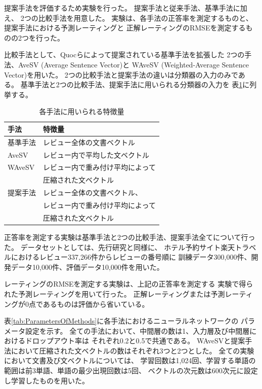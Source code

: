 \documentclass[twocolumn,a4paper]{ltjarticle}
\begin{document}
提案手法を評価するため実験を行った。
提案手法と従来手法\cite{fujitani15}、基準手法に加え、 2つの比較手法を用意した。
実験は、各手法の正答率を測定するものと、提案手法における予測レーティングと
正解レーティングのRMSEを測定するものの2つを行った。

比較手法として、Quocら\cite{quoc14}によって提案されている基準手法を拡張した
2つの手法、AveSV (Average Sentence Vector)と
WAveSV (Weighted-Average Sentence Vector)を用いた。
2つの比較手法と提案手法の違いは分類器の入力のみである。
基準手法と2つの比較手法、提案手法に用いられる分類器の入力を
表\ref{tab:MethodFeatures}に列挙する。

\begin{table}[b]
  \caption{各手法に用いられる特徴量}
  \centering
  \begin{tabularx}{\linewidth}{l | X} \label{tab:MethodFeatures}
    手法 & 特徴量 \\
    \hline
    基準手法 & レビュー全体の文書ベクトル \\
    \hline
    AveSV & レビュー内で平均した文ベクトル \\
    \hline
    WAveSV & レビュー内で重み付け平均によって \\
           & 圧縮された文ベクトル \\
    \hline
    提案手法 & レビュー全体の文書ベクトル、\\
             & レビュー内で重み付け平均によって \\
             & 圧縮された文ベクトル \\
  \end{tabularx}
\end{table}


正答率を測定する実験は基準手法と2つの比較手法、提案手法全てについて行った。
データセットとしては、先行研究\cite{fujitani15}と同様に、
ホテル予約サイト楽天トラベルにおけるレビュー337,266件からレビューの番号順に
訓練データ300,000件、開発データ10,000件、評価データ10,000件を用いた。

レーティングのRMSEを測定する実験は、上記の正答率を測定する
実験で得られた予測レーティングを用いて行った。
正解レーティングまたは予測レーティングが0点であるものは評価から省いている。

表\ref{tab:ParametersOfMethods}に各手法におけるニューラルネットワークの
パラメータ設定を示す。
全ての手法において、中間層の数は1、入力層及び中間層におけるドロップアウト率は
それぞれ0.2と0.5で共通である。
WAveSVと提案手法において圧縮された文ベクトルの数はそれぞれ3つと2つとした。
全ての実験において文書及び文ベクトルについては、
学習回数は1,024回、学習する単語の範囲は前3単語、単語の最少出現回数は5回、
ベクトルの次元数は600次元に設定し学習したものを用いた。
\end{document}
